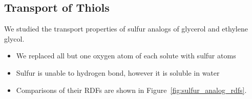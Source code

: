\documentclass{article}
\begin{document}
  \subsection*{Transport of Thiols} %
  
  We studied the transport properties of sulfur analogs of glycerol and ethylene glycol.
  \begin{itemize}
    \item We replaced all but one oxygen atom of each solute with sulfur atoms
  	\item Sulfur is unable to hydrogen bond, however it is soluble in water  %
  	\item Comparisons of their RDFs are shown in Figure~\ref{fig:sulfur_analog_rdfs}.
  \end{itemize}
  
\end{document}
